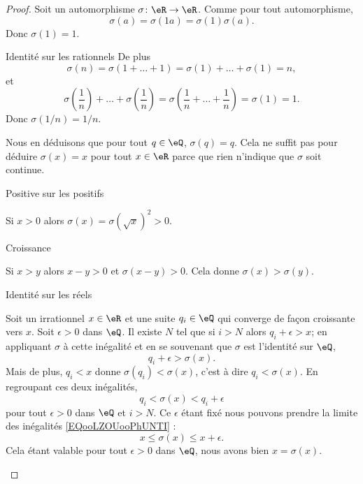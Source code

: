\begin{proof}
    Soit un automorphisme \( \sigma\colon \eR\to \eR\). Comme pour tout automorphisme, 
    \begin{equation}
        \sigma(a)=\sigma(1a)=\sigma(1)\sigma(a).
    \end{equation}
    Donc \( \sigma(1)=1\).

    \begin{subproof}
    \item[Identité sur les rationnels]
    De plus 
    \begin{equation}
        \sigma(n)=\sigma(1+\ldots +1)=\sigma(1)+\ldots +\sigma(1)=n,
    \end{equation}
    et
    \begin{equation}
        \sigma\left( \frac{1}{ n } \right)+\ldots +\sigma\left( \frac{1}{ n } \right)=\sigma\left( \frac{1}{ n }+\ldots +\frac{1}{ n } \right)=\sigma(1)=1.
    \end{equation}
    Donc \( \sigma(1/n)=1/n\).

    Nous en déduisons que pour tout \( q\in \eQ\), \( \sigma(q)=q\). Cela ne suffit pas pour déduire \( \sigma(x)=x\) pour tout \( x\in \eR\) parce que rien n'indique que \( \sigma\) soit continue.
        \item[Positive sur les positifs]

            Si \( x>0\) alors \( \sigma(x)=\sigma(\sqrt{ x })^2>0\).

        \item[Croissance]

            Si \( x>y\) alors \( x-y>0\) et \( \sigma(x-y)>0\). Cela donne \( \sigma(x)>\sigma(y)\).

        \item[Identité sur les réels]

            Soit un irrationnel \( x\in \eR\) et une suite \( q_i\in \eQ\) qui converge de façon croissante vers \( x\). Soit \( \epsilon>0\) dans \( \eQ\). Il existe \( N\) tel que si \( i>N\) alors \( q_i+\epsilon>x\); en appliquant \( \sigma\) à cette inégalité et en se souvenant que \( \sigma\) est l'identité sur \( \eQ\),
            \begin{equation}
                q_i+\epsilon>\sigma(x).
            \end{equation}
            Mais de plus, \( q_i<x\) donne \( \sigma(q_i)<\sigma(x)\), c'est à dire \( q_i<\sigma(x)\). En regroupant ces deux inégalités,
            \begin{equation}        \label{EQooLZOUooPhUNTI}
                q_i<\sigma(x)<q_i+\epsilon
            \end{equation}
            pour tout \( \epsilon>0\) dans \( \eQ\) et \( i>N\). Ce \( \epsilon\) étant fixé nous pouvons prendre la limite des inégalités \eqref{EQooLZOUooPhUNTI} :
            \begin{equation}
                x\leq \sigma(x)\leq x+\epsilon.
            \end{equation}
            Cela étant valable pour tout \( \epsilon>0\) dans \( \eQ\), nous avons bien \( x=\sigma(x)\).
    \end{subproof}
\end{proof}

